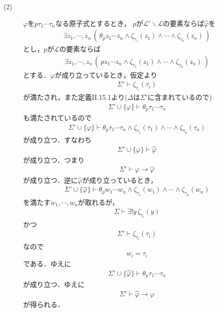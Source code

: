 \documentclass[a4j,10.5pt,oneside,openany]{jsbook}
\theoremstyle{mystyle}
\begin{document}
\begin{description}
		\item[(2)]
			$\varphi$を$p\tau_{1}\cdots\tau_{n}$なる原子式とするとき，
			$p$が$\mathcal{L}' \backslash \mathcal{L}$の要素ならば$\hat{\varphi}$を
			\begin{align}
				\exists z_{1},\cdots,z_{n}\, 
				\left(\, \theta_{p}z_{1} \cdots z_{n} \wedge \zeta_{\tau_{1}}(z_{1})
				\wedge \cdots \wedge \zeta_{\tau_{n}}(z_{n})\, \right)
			\end{align}
			とし，$p$が$\mathcal{L}$の要素ならば
			\begin{align}
				\exists z_{1},\cdots,z_{n}\, 
				\left(\, pz_{1} \cdots z_{n} \wedge \zeta_{\tau_{1}}(z_{1})
				\wedge \cdots \wedge \zeta_{\tau_{n}}(z_{n})\, \right)
			\end{align}
			とする．$\varphi$が成り立っているとき，仮定より
			\begin{align}
				\Sigma' \vdash \zeta_{\tau_{i}}(\tau_{i})
			\end{align}
			が満たされ，また定義I\hspace{-.1em}I.15.1より($\Delta$は$\Sigma'$に含まれているので)
			\begin{align}
				\Sigma' \cup \{\varphi\} \vdash \theta_{p}\tau_{1} \cdots \tau_{n}
			\end{align}
			も満たされているので
			\begin{align}
				\Sigma' \cup \{\varphi\} \vdash \theta_{p}\tau_{1} \cdots \tau_{n}
				\wedge \zeta_{\tau_{1}}(\tau_{1}) \wedge \cdots \wedge 
				\zeta_{\tau_{n}}(\tau_{n})
			\end{align}
			が成り立つ．すなわち
			\begin{align}
				\Sigma' \cup \{\varphi\} \vdash \hat{\varphi}
			\end{align}
			が成り立つ．つまり
			\begin{align}
				\Sigma' \vdash \varphi \rightarrow \hat{\varphi}
			\end{align}
			が成り立つ．逆に$\hat{\varphi}$が成り立っているとき，
			\begin{align}
				\Sigma' \cup \{\hat{\varphi}\} \vdash \theta_{p}w_{1} \cdots w_{n}
				\wedge \zeta_{\tau_{1}}(w_{1}) \wedge \cdots \wedge 
				\zeta_{\tau_{n}}(w_{n})
			\end{align}
			を満たす$w_{1},\cdots,w_{n}$が取れるが，
			\begin{align}
				\Sigma \vdash \exists! y\, \zeta_{\tau_{i}}(y)
			\end{align}
			かつ
			\begin{align}
				\Sigma' \vdash \zeta_{\tau_{i}}(\tau_{i})
			\end{align}
			なので
			\begin{align}
				w_{i} = \tau_{i}
			\end{align}
			である．ゆえに
			\begin{align}
				\Sigma' \cup \{\hat{\varphi}\} \vdash \theta_{p}\tau_{1} \cdots \tau_{n}
			\end{align}
			が成り立つ．ゆえに
			\begin{align}
				\Sigma' \vdash \hat{\varphi} \rightarrow \varphi
			\end{align}
			が得られる．
	\end{description}
\end{document}
